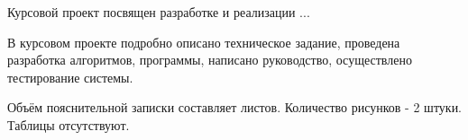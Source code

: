 \vspace*{\fill}
Курсовой проект посвящен разработке и реализации ...

В курсовом проекте подробно описано техническое задание, проведена разработка алгоритмов, программы, написано руководство, осуществлено тестирование системы.

Объём пояснительной записки составляет \pageref{LastPage} листов. Количество рисунков - 2 штуки. Таблицы отсутствуют.
\vspace*{\fill}